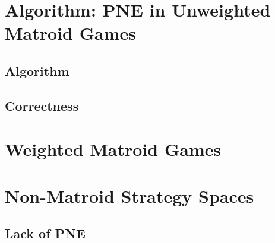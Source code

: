 \documentclass{beamer}
\begin{document}
\section{Algorithm: PNE in Unweighted Matroid Games}
\subsection{Algorithm}
\begin{frame}
\end{frame}

\subsection{Correctness}
\begin{frame}
\end{frame}

\section{Weighted Matroid Games}
\begin{frame}
\end{frame}

\section{Non-Matroid Strategy Spaces}
\subsection{Lack of PNE}
\begin{frame}
\end{frame}
\end{document}
